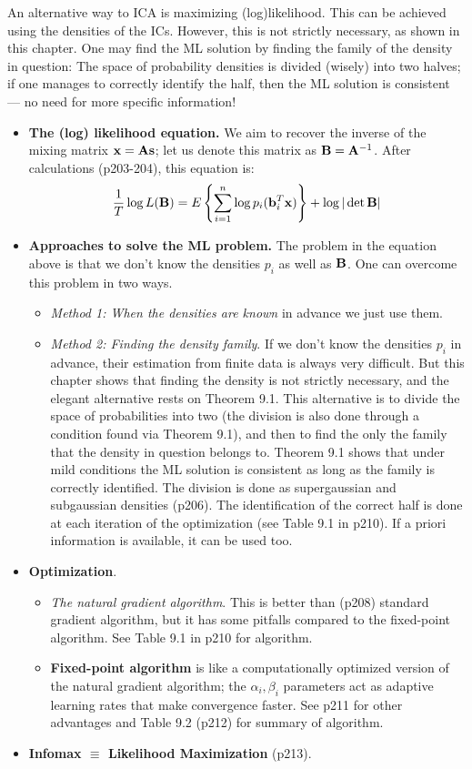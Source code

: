\documentclass[a4paper]{book}
\begin{document}
An alternative way to ICA is maximizing (log)likelihood. This can be achieved using the densities of the ICs. However, this is not strictly necessary, as shown in this chapter. One may find the ML solution by finding the family of the density in question: The space of probability densities is divided (wisely) into two halves; if one manages to correctly identify the half, then the ML solution is consistent \---- no need for more specific information!


\begin{itemize}
\item \textbf{The (log) likelihood equation.} We aim to recover the inverse of the mixing matrix $\mathbf {x = As}$; let us denote this matrix as $\mathbf{B} = \mathbf A^{-1}$. After calculations (p203-204), this equation is: %
$$\frac{1}{T} \log L(\mathbf B) = E\left\{ \sum\limits_{i=1}^n \log p_i (\mathbf b_i^T \mathbf x) \right\} + \log |\det \mathbf B| $$  
\item \textbf{Approaches to solve the ML problem.} The problem in the equation above is that we don't know the densities $p_i$ as well as $\mathbf B$. One can overcome this problem in two ways.
	\begin{itemize}
	\item \textit{Method 1: When the densities are known} in advance we just use them.
	\item \textit{Method 2: Finding the density family}. If we don't know the densities $p_i$ in advance, their estimation from finite data is always very difficult. But this chapter shows that finding the density is not strictly necessary, and the elegant alternative rests on Theorem 9.1. This alternative is to divide the space of probabilities into two (the division is also done through a condition found via Theorem 9.1), and then to find the only the family that the density in question belongs to. Theorem 9.1 shows that under mild conditions the ML solution is consistent as long as the family is correctly identified. The division is done as supergaussian and subgaussian densities (p206). The identification of the correct half is done at each iteration of the optimization (see Table 9.1 in p210). If a priori information is available, it can be used too.
	\end{itemize}
\item \textbf{Optimization}.
	\begin{itemize}
	\item \textit{The natural gradient algorithm}. This is better than (p208) standard gradient algorithm, but it has some pitfalls compared to the fixed-point algorithm. See Table 9.1 in p210 for algorithm.
	\item \textbf{Fixed-point algorithm} is like a computationally optimized version of the natural gradient algorithm; the $\alpha_i, \beta_i$ parameters act as adaptive learning rates that make convergence faster. See p211 for other advantages and Table 9.2 (p212) for summary of algorithm.
	\end{itemize}
\item \textbf{Infomax $\equiv$ Likelihood Maximization } (p213).
\end{itemize}
\end{document}
